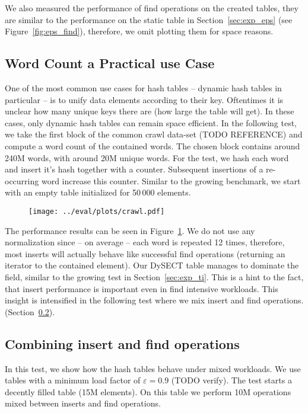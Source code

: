 \documentclass[a4paper,UKenglish]{lipics-v2016}
\begin{document}
We also measured the performance of find operations on the created
tables, they are similar to the performance on the static table in
Section~\ref{sec:exp_eps} (see Figure~\ref{fig:eps_find}), therefore,
we omit plotting them for space reasons.

\subsection{Word Count a Practical use Case}
One of the most common use cases for hash tables -- dynamic hash
tables in particular -- is to unify data elements according to their
key.  Oftentimes it is unclear how many unique keys there are (how
large the table will get).  In these cases, only dynamic hash tables
can remain space efficient.  In the following test, we take the first
block of the common crawl data-set (TODO REFERENCE) and compute a word
count of the contained words.  The chosen block contains around 240M
words, with around 20M unique words. For the test, we hash each word
and insert it's hash together with a counter.  Subsequent insertions
of a re-occurring word increase this counter.  Similar to the growing
benchmark, we start with an empty table initialized for 50\,000
elements.

\begin{figure}[ht]
  \centering
  \texttt{[image: ../eval/plots/crawl.pdf]}
  \caption{\label{fig:crawl} }
\end{figure}

The performance results can be seen in Figure~\ref{fig:crawl}.  We do
not use any normalization since -- on average -- each word is repeated
12 times, therefore, most inserts will actually behave like successful
find operations (returning an iterator to the contained element).  Our
DySECT table manages to dominate the field, similar to the growing
test in Section~\ref{sec:exp_ti}.  This is a hint to the fact, that
insert performance is important even in find intensive workloads.
This insight is intensified in the following test where we mix insert
and find operations.  (Section~\ref{sec:exp_mix}).


\subsection{Combining insert and find operations}
\label{sec:exp_mix}
In this test, we show how the hash tables behave under mixed
workloads.  We use tables with a minimum load factor of $\varepsilon =
0.9$ (TODO verify).  The test starts a decently filled table
(15M elements).  On this table we perform 10M operations mixed between inserts and
find operations.
\end{document}
